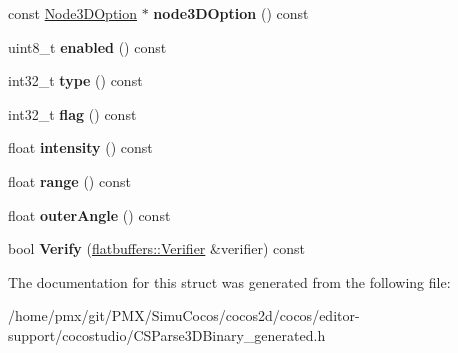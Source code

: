 \begin{DoxyCompactItemize}
const \hyperlink{structflatbuffers_1_1Node3DOption}{Node3\+D\+Option} $\ast$ {\bfseries node3\+D\+Option} () const
\item 
\mbox{\label{structflatbuffers_1_1Light3DOption_a12132acd7628b8e0fa9c4bad41fe4099}} 
uint8\+\_\+t {\bfseries enabled} () const
\item 
\mbox{\label{structflatbuffers_1_1Light3DOption_a6a6fe189518e602c80ce17e497185a28}} 
int32\+\_\+t {\bfseries type} () const
\item 
\mbox{\label{structflatbuffers_1_1Light3DOption_a345237a0fa11b0c15da23eef8e8dcfbc}} 
int32\+\_\+t {\bfseries flag} () const
\item 
\mbox{\label{structflatbuffers_1_1Light3DOption_a8037c3813c3a3bb1cf6b77de6ecf1faa}} 
float {\bfseries intensity} () const
\item 
\mbox{\label{structflatbuffers_1_1Light3DOption_ae57d717d986c36d8f7e91273ef2ddf93}} 
float {\bfseries range} () const
\item 
\mbox{\label{structflatbuffers_1_1Light3DOption_a20b0cdb3e9fd53d67a71b91744609d59}} 
float {\bfseries outer\+Angle} () const
\item 
\mbox{\label{structflatbuffers_1_1Light3DOption_ac4f85b60be2d6824eabe6c7e8d7df32d}} 
bool {\bfseries Verify} (\hyperlink{classflatbuffers_1_1Verifier}{flatbuffers\+::\+Verifier} \&verifier) const
\end{DoxyCompactItemize}


The documentation for this struct was generated from the following file\+:\begin{DoxyCompactItemize}
\item 
/home/pmx/git/\+P\+M\+X/\+Simu\+Cocos/cocos2d/cocos/editor-\/support/cocostudio/C\+S\+Parse3\+D\+Binary\+\_\+generated.\+h\end{DoxyCompactItemize}
